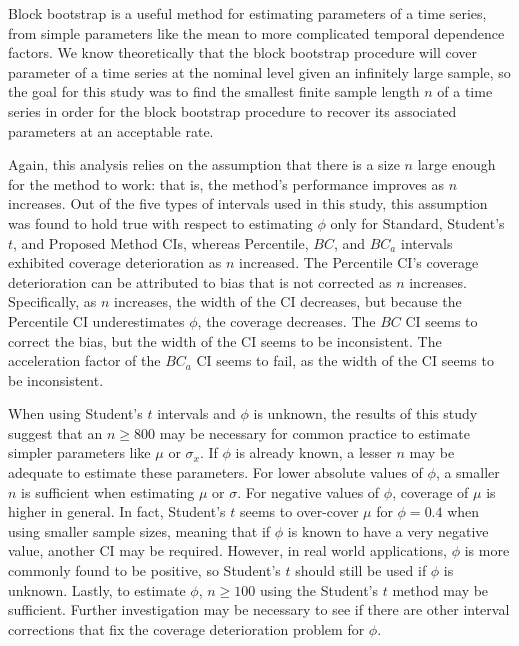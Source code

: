\documentclass[12pt, letterpaper, titlepage]{article}
\begin{document}
Block bootstrap is a useful method for estimating parameters of a time
series, from simple parameters like the mean to more complicated temporal
 dependence factors.
 We know theoretically that the block bootstrap procedure will cover
  parameter of a time series at the nominal level given an
 infinitely large
sample, so the goal for this study was to find the smallest finite
sample length $n$ of a time series in order for the block bootstrap procedure
to 
recover its associated parameters at an acceptable rate.

Again, this analysis relies on the assumption that
there is a size $n$ large enough for the method to work: that is, the method's
performance improves as $n$ increases. Out of the five types of intervals used
in this study, this assumption was found to hold true with respect to
estimating $\phi$ only for Standard, Student's $t$, and Proposed Method CIs, 
whereas Percentile, 
$BC$, and $BC_a$ intervals exhibited coverage deterioration as $n$
increased. The Percentile CI's coverage deterioration can be attributed to
bias that is not corrected as $n$ increases. Specifically, as $n$ increases, 
the width of the CI decreases, but because the Percentile CI
underestimates $\phi$, the coverage decreases. The $BC$ CI seems to correct the 
bias, but the width of the CI seems to be inconsistent. The acceleration 
factor of the $BC_a$ CI seems to fail, as the width of the CI
seems to be inconsistent. 

When using Student's $t$ intervals and $\phi$ is
unknown, the results of this study suggest that an $n \geq 800$ may be
necessary for common practice to estimate simpler parameters like $\mu$ 
or $\sigma_x$. If $\phi$ is already known, a lesser $n$ may be adequate
to
estimate these parameters. For lower absolute values of $\phi$, a smaller
$n$ is sufficient when estimating $\mu$ or $\sigma$. For negative
values of $\phi$, coverage of $\mu$ is higher in general. In fact, 
Student's $t$ seems to over-cover $\mu$ for $\phi = 0.4$ when using smaller
sample sizes, 
meaning that if $\phi$ is known to have a very negative value, another CI
may be required.
However, in real world applications, $\phi$ is
more commonly found to be positive, so Student's $t$ should still be used
if $\phi$ is unknown.
Lastly, to estimate $\phi$, $n \geq 100$ using the 
Student's $t$ method
 may be sufficient.
Further investigation may be necessary to see if there are other interval
corrections that fix the coverage deterioration problem for $\phi$.
\end{document}
